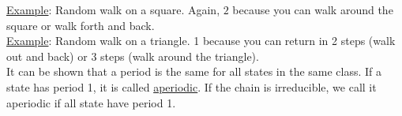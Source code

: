     \noindent\underline{Example}: Random walk on a square. Again, $2$ because you
      can walk around the square or walk forth and back.\\

    \noindent\underline{Example}: Random walk on a triangle. 1 because you can
    return in 2 steps (walk out and back) or 3 steps (walk around the triangle).\\ 

  \noindent It can be shown that a period is the same for all states in the same
    class. If a state has period 1, it is called \underline{aperiodic}. If the chain
    is irreducible, we call it aperiodic if all state have period 1.

